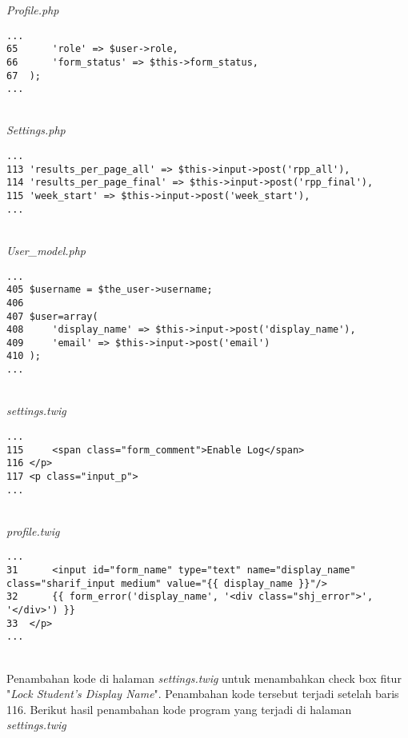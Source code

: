 \textit{Profile.php}
\begin{lstlisting}[basicstyle=\ttfamily, frame=single,
columns=fullflexible, keepspaces=true, breaklines=true]
...
65		'role' => $user->role,
66		'form_status' => $this->form_status,
67	);
...
\end{lstlisting}
~\\
\textit{Settings.php}
\begin{lstlisting}[basicstyle=\ttfamily, frame=single,
columns=fullflexible, keepspaces=true, breaklines=true]
...
113	'results_per_page_all' => $this->input->post('rpp_all'),
114	'results_per_page_final' => $this->input->post('rpp_final'),
115	'week_start' => $this->input->post('week_start'),
...
\end{lstlisting}
~\\
\textit{User\_model.php}
\begin{lstlisting}[basicstyle=\ttfamily, frame=single,
columns=fullflexible, keepspaces=true, breaklines=true]
...
405	$username = $the_user->username;
406
407	$user=array(
408		'display_name' => $this->input->post('display_name'),
409		'email' => $this->input->post('email')
410	);
...
\end{lstlisting}
~\\
\textit{settings.twig}
\begin{lstlisting}[basicstyle=\ttfamily, frame=single,
columns=fullflexible, keepspaces=true, breaklines=true]
...
115		<span class="form_comment">Enable Log</span>
116	</p>
117	<p class="input_p">
...
\end{lstlisting}
~\\
\textit{profile.twig}
\begin{lstlisting}[basicstyle=\ttfamily, frame=single,
columns=fullflexible, keepspaces=true, breaklines=true]
...
31		<input id="form_name" type="text" name="display_name" class="sharif_input medium" value="{{ display_name }}"/>
32		{{ form_error('display_name', '<div class="shj_error">', '</div>') }}
33	</p>
...
\end{lstlisting}
~\\
Penambahan kode di halaman \textit{settings.twig} untuk menambahkan check box fitur "\textit{Lock Student's Display Name}". Penambahan kode tersebut terjadi setelah baris 116. Berikut hasil penambahan kode program yang terjadi di halaman \textit{settings.twig}

